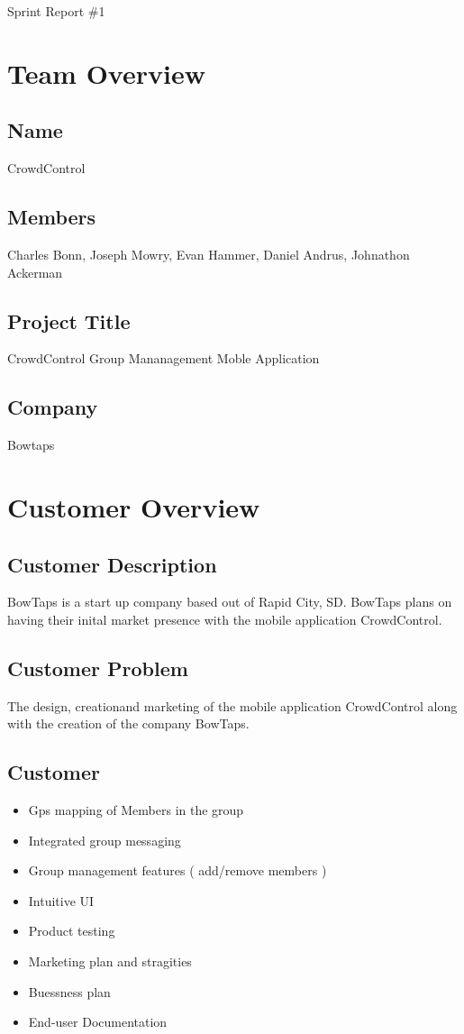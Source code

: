 \documentclass[11pt]{article}
\begin{document}
{\fontsize{16}{16}\selectfont Sprint Report \#1}

\section*{Team Overview}

\subsection*{Name}
CrowdControl
\subsection*{Members}
Charles Bonn, Joseph Mowry, Evan Hammer, Daniel Andrus, Johnathon Ackerman
\subsection*{Project Title}
CrowdControl Group Mananagement Moble Application
\subsection*{Company}
Bowtaps

\section*{Customer Overview}

\subsection*{Customer Description}
BowTaps is a start up company based out of Rapid City, SD. BowTaps plans on having their inital market presence with the mobile application CrowdControl.

\subsection*{Customer Problem}
The design, creationand marketing of the mobile application CrowdControl along with the creation of the company BowTaps.

\subsection*{Customer}

	\begin{itemize}
		\item Gps mapping of Members in the group
		\item Integrated group messaging
		\item Group management features ( add/remove members )
		\item Intuitive UI
		\item Product testing
		\item Marketing plan and stragities
		\item Buessness plan
		\item End-user Documentation
	\end{itemize}
\end{document}
